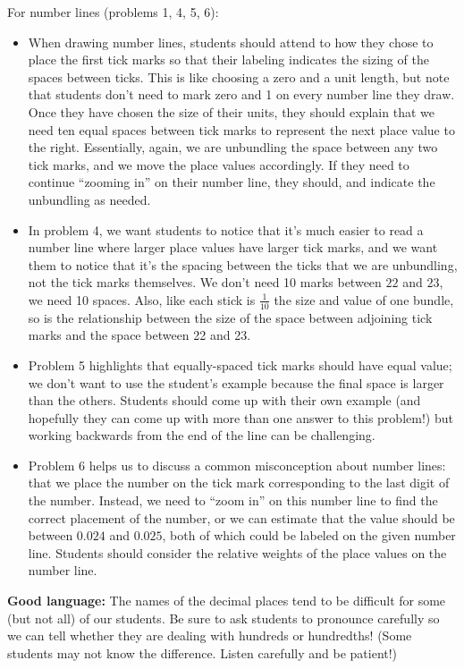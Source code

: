 \documentclass[nooutcomes,noauthor,handout]{ximera}
\begin{document}
\begin{instructorNotes}
For number lines (problems 1, 4, 5, 6):

\begin{itemize}
	\item When drawing number lines, students should attend to how they chose to place the first tick marks so that their labeling indicates the sizing of the spaces between ticks. This is like choosing a zero and a unit length, but note that students don't need to mark zero and 1 on every number line they draw. Once they have chosen the size of their units, they should explain that we need ten equal spaces between tick marks to represent the next place value to the right. Essentially, again, we are unbundling the space between any two tick marks, and we move the place values accordingly. If they need to continue ``zooming in'' on their number line, they should, and indicate the unbundling as needed.
	\item In problem 4, we want students to notice that it's much easier to read a number line where larger place values have larger tick marks, and we want them to notice that it's the spacing between the ticks that we are unbundling, not the tick marks themselves. We don't need 10 marks between $22$ and $23$, we need 10 spaces. Also, like each stick is $\frac{1}{10}$ the size and value of one bundle, so is the relationship between the size of the space between adjoining tick marks and the space between 22 and 23.
    \item  Problem 5 highlights that equally-spaced tick marks should have equal value; we don't want to use the student's example because the final space is larger than the others. Students should come up with their own example (and hopefully they can come up with more than one answer to this problem!) but working backwards from the end of the line can be challenging.
    \item Problem 6 helps us to discuss a common misconception about number lines: that we place the number on the tick mark corresponding to the last digit of the number. Instead, we need to ``zoom in'' on this number line to find the correct placement of the number, or we can estimate that the value should be between $0.024$ and $0.025$, both of which could be labeled on the given number line. Students should consider the relative weights of the place values on the number line.
    
\end{itemize}



{\bf Good language:} The names of the decimal places tend to be difficult for some (but not all) of our students. Be sure to ask students to pronounce carefully so we can tell whether they are dealing with hundreds or hundredths! (Some students may not know the difference. Listen carefully and be patient!)


\end{instructorNotes}
\end{document}

